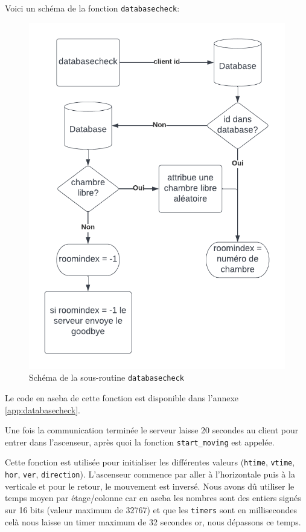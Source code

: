 Voici un schéma de la fonction \texttt{databasecheck}:

\begin{figure}[h]
	\centering
	\includegraphics[scale=0.25]{code/server_databasecheck}
	\caption{Schéma de la sous-routine \texttt{databasecheck}}
	\label{fig:schéma database}
\end{figure}

Le code en aseba de cette fonction est disponible dans l'annexe \ref{app:databasecheck}.

Une fois la communication terminée le serveur laisse 20 secondes au client pour entrer dans l'ascenseur, après quoi la fonction \texttt{start\_moving} est appelée.

Cette fonction est utilisée pour initialiser les différentes valeurs (\texttt{htime}, \texttt{vtime}, \texttt{hor}, \texttt{ver}, \texttt{direction}). L'ascenseur commence par aller à l'horizontale puis à la verticale et pour le retour, le mouvement est inversé. Nous avons dû utiliser le temps moyen par étage/colonne car en aseba les nombres sont des entiers signés sur 16 bits (valeur maximum de 32767) et que les \texttt{timers} sont en millisecondes celà nous laisse un timer maximum de 32 secondes or, nous dépassons ce temps.


